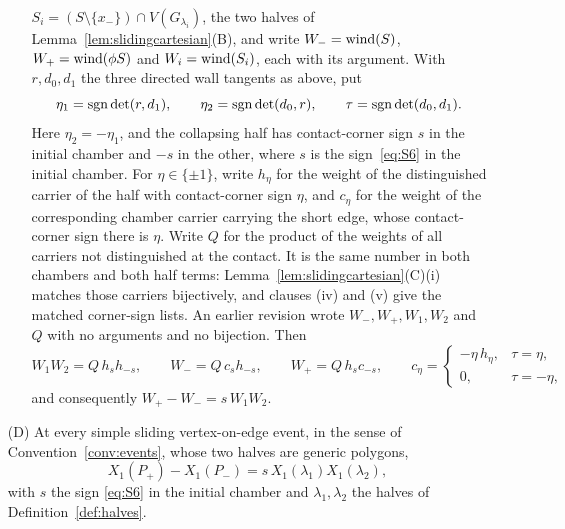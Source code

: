 \begin{lemma}
\begin{enumerate}
\begin{enumerate}
$S_i=(S\setminus\{x_-\})\cap V(G_{\lambda_i})$, the two halves of
Lemma~\ref{lem:slidingcartesian}(B), and write
$W_-=\wind(S)$, $W_+=\wind(\phi S)$ and $W_i=\wind(S_i)$, each with its
argument. With $r,d_0,d_1$ the three directed wall tangents as above, put
\[
 \eta_1=\sgn\det(r,d_1),\qquad \eta_2=\sgn\det(d_0,r),\qquad
 \tau=\sgn\det(d_0,d_1).
\]
Here $\eta_2=-\eta_1$, and the collapsing half has contact-corner sign $s$ in
the initial chamber and $-s$ in the other, where $s$ is the sign~\eqref{eq:S6}
in the initial chamber. For $\eta\in\{\pm1\}$, write $h_\eta$ for the weight of
the distinguished carrier of the half with contact-corner sign $\eta$, and
$c_\eta$ for the weight of the corresponding chamber carrier carrying the short
edge, whose contact-corner sign there is $\eta$. Write $Q$ for the product of
the weights of all carriers not distinguished at the contact. It is the same
number in both chambers and both half terms: Lemma~\ref{lem:slidingcartesian}(C)(i)
matches those carriers bijectively, and clauses (iv) and (v) give the matched
corner-sign lists. An earlier revision wrote $W_-,W_+,W_1,W_2$ and $Q$ with no
arguments and no bijection. Then
\[
   W_1W_2=Q\,h_s h_{-s},\qquad
   W_-=Q\,c_s h_{-s},\qquad
   W_+=Q\,h_s c_{-s},\qquad
   c_\eta=\begin{cases}-\eta\,h_\eta,&\tau=\eta,\\ 0,&\tau=-\eta,\end{cases}
\]
and consequently $W_+-W_-=s\,W_1W_2$.
\end{enumerate}

\item[(D)] At every simple sliding vertex-on-edge event, in the sense of
Convention~\ref{conv:events}, whose two halves are generic polygons,
\[
   X_1(P_+)-X_1(P_-)=s\,X_1(\lambda_1)X_1(\lambda_2),
\]
with $s$ the sign \eqref{eq:S6} in the initial chamber and $\lambda_1,\lambda_2$
the halves of Definition~\ref{def:halves}.
\end{enumerate}
\end{lemma}
